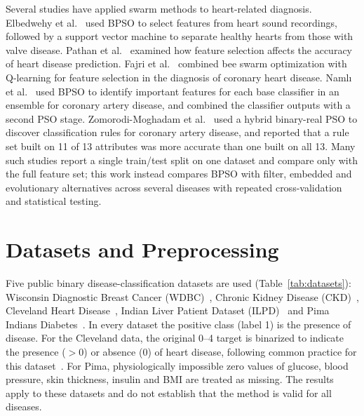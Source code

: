 \documentclass[conference]{IEEEtran}
\begin{document}
Several studies have applied swarm methods to heart-related diagnosis.
Elbedwehy et al.~\cite{elbedwehy2012} used BPSO to select features from heart
sound recordings, followed by a support vector machine to separate healthy
hearts from those with valve disease. Pathan et al.~\cite{pathan2022} examined
how feature selection affects the accuracy of heart disease prediction. Fajri
et al.~\cite{fajri2023} combined bee swarm optimization with Q-learning for
feature selection in the diagnosis of coronary heart disease. Naml{\i} et
al.~\cite{namli2024} used BPSO to identify important features for each base
classifier in an ensemble for coronary artery disease, and combined the
classifier outputs with a second PSO stage. Zomorodi-Moghadam et
al.~\cite{zomorodi2021} used a hybrid binary-real PSO to discover
classification rules for coronary artery disease, and reported that a rule set
built on 11 of 13 attributes was more accurate than one built on all 13. Many
such studies report a single train/test split on one dataset and compare only
with the full feature set; this work instead compares BPSO with filter,
embedded and evolutionary alternatives across several diseases with repeated
cross-validation and statistical testing.

\section{Datasets and Preprocessing}

Five public binary disease-classification datasets are used
(Table~\ref{tab:datasets}): Wisconsin Diagnostic Breast Cancer
(WDBC)~\cite{street1993}, Chronic Kidney Disease (CKD)~\cite{rubini2015},
Cleveland Heart Disease~\cite{janosi1988}, Indian Liver Patient Dataset
(ILPD)~\cite{ramana2012} and Pima Indians Diabetes~\cite{smith1988}. In every
dataset the positive class (label 1) is the presence of disease. For the
Cleveland data, the original 0--4 target is binarized to indicate the presence
($>0$) or absence ($0$) of heart disease, following common practice for this
dataset~\cite{detrano1989}. For Pima, physiologically impossible zero values
of glucose, blood pressure, skin thickness, insulin and BMI are treated as
missing. The results apply to these datasets and do not establish that the
method is valid for all diseases.
\end{document}
